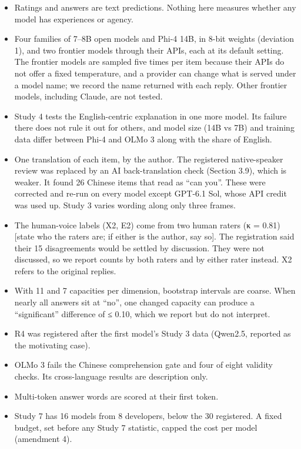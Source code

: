 \documentclass[
  11pt,
]{article}
\providecommand{\tightlist}{%
  \setlength{\itemsep}{0pt}\setlength{\parskip}{0pt}}
\begin{document}
\begin{itemize}
\tightlist
\item
  Ratings and answers are text predictions. Nothing here measures
  whether any model has experiences or agency.
\item
  Four families of 7--8B open models and Phi-4 14B, in 8-bit weights
  (deviation 1), and two frontier models through their APIs, each at its
  default setting. The frontier models are sampled five times per item
  because their APIs do not offer a fixed temperature, and a provider
  can change what is served under a model name; we record the name
  returned with each reply. Other frontier models, including Claude, are
  not tested.
\item
  Study 4 tests the English-centric explanation in one more model. Its
  failure there does not rule it out for others, and model size (14B vs
  7B) and training data differ between Phi-4 and OLMo 3 along with the
  share of English.
\item
  One translation of each item, by the author. The registered
  native-speaker review was replaced by an AI back-translation check
  (Section 3.9), which is weaker. It found 26 Chinese items that read as
  ``can you''. These were corrected and re-run on every model except
  GPT-6.1 Sol, whose API credit was used up. Study 3 varies wording
  along only three frames.
\item
  The human-voice labels (X2, E2) come from two human raters (κ = 0.81)
  {[}state who the raters are; if either is the author, say so{]}. The
  registration said their 15 disagreements would be settled by
  discussion. They were not discussed, so we report counts by both
  raters and by either rater instead. X2 refers to the original replies.
\item
  With 11 and 7 capacities per dimension, bootstrap intervals are
  coarse. When nearly all answers sit at ``no'', one changed capacity
  can produce a ``significant'' difference of ≤ 0.10, which we report
  but do not interpret.
\item
  R4 was registered after the first model's Study 3 data (Qwen2.5,
  reported as the motivating case).
\item
  OLMo 3 fails the Chinese comprehension gate and four of eight validity
  checks. Its cross-language results are description only.
\item
  Multi-token answer words are scored at their first token.
\item
  Study 7 has 16 models from 8 developers, below the 30 registered. A
  fixed budget, set before any Study 7 statistic, capped the cost per
  model (amendment 4).


\end{itemize}
\end{document}
